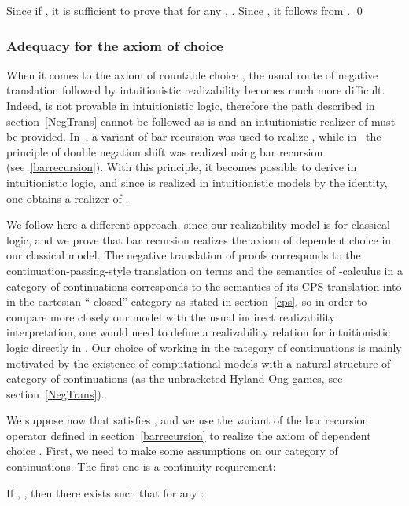 \documentclass{CSML}
\begin{document}
Since  if , it is sufficient to prove that for any , . Since , it follows from .
\qed
\subsubsection{Adequacy for the axiom of choice}
\label{ChoiceAdequacy}
When it comes to the axiom of countable choice , the usual route of negative translation followed by intuitionistic realizability becomes much more difficult. Indeed,  is not provable in intuitionistic logic, therefore the path described in section~\ref{NegTrans} cannot be followed as-is and an intuitionistic realizer of  must be provided. In~\cite{BerardiBezemCoquand}, a variant of bar recursion was used to realize , while in~\cite{BergerOlivaChoice} the principle of double negation shift  was realized using bar recursion (see~\ref{barrecursion}). With this principle, it becomes possible to derive  in intuitionistic logic, and since  is realized in intuitionistic models by the identity, one obtains a realizer of .\par
We follow here a different approach, since our realizability model is for classical logic, and we prove that bar recursion realizes the axiom of dependent choice  in our classical model. The negative translation of proofs corresponds to the continuation-passing-style translation on terms and the semantics of -calculus in a category of continuations  corresponds to the semantics of its CPS-translation into  in the cartesian ``-closed'' category  as stated in section~\ref{cps}, so in order to compare more closely our model with the usual indirect realizability interpretation, one would need to define a realizability relation for intuitionistic logic directly in . Our choice of working in the category of continuations  is mainly motivated by the existence of computational models with a natural structure of category of continuations (as the unbracketed Hyland-Ong games, see section~\ref{NegTrans}).\par
We suppose now that  satisfies , and we use the variant of the bar recursion operator defined in section~\ref{barrecursion} to realize the axiom of dependent choice . First, we need to make some assumptions on our category of continuations. The first one is a continuity requirement:
\begin{defi}[Continuity]
\label{continuity}
If , , then there exists  such that for any :

\end{defi}\medskip
\end{document}
